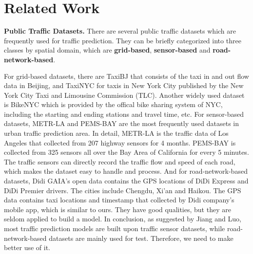 
\section{Related Work}
\textbf{Public Traffic Datasets.} There are several public traffic datasets which are frequently used for traffic prediction. They can be briefly categorized into three classes by spatial domain, which are \textbf{grid-based}, \textbf{sensor-based} and \textbf{road-network-based}.

For grid-based datasets, there are TaxiBJ\cite{taxibj} that consists of the taxi in and out flow data in Beijing, and TaxiNYC for taxis in New York City published by the New York City Taxi and Limousine Commission (TLC). Another widely used dataset is BikeNYC which is provided by the offical bike sharing system of NYC, including the starting and ending stations and travel time, etc. For sensor-based datasets, METR-LA\cite{DCRNN} and PEMS-BAY are the most frequently used datasets in urban traffic prediction area. In detail, METR-LA is the traffic data of Los Angeles that collected from 207 highway sensors for 4 months. PEMS-BAY is collected from 325 sensors all over the Bay Area of California for every 5 minutes. The traffic sensors can directly record the traffic flow and speed of each road, which makes the dataset easy to handle and process. And for road-network-based datasets, Didi GAIA's open data contains the GPS locations of DiDi Express and DiDi Premier drivers. The cities include Chengdu, Xi'an and Haikou. The GPS data contains taxi locations and timestamp that collected by Didi company's mobile app, which is similar to ours. They have good qualities, but they are seldom applied to build a model. In conclusion, as suggested by Jiang and Luo\cite{surveyGNN}, most traffic prediction models are built upon traffic sensor datasets, while road-network-based datasets are mainly used for test. Therefore, we need to make better use of it.

\vspace{\baselineskip}

